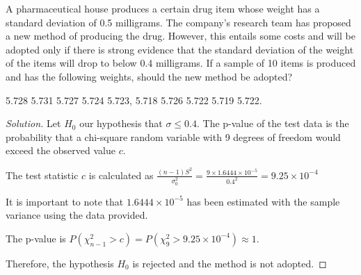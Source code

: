 \documentclass[titlepage, letterpaper, fleqn]{article}
\renewcommand\qedsymbol{\(\blacksquare\)}
\newenvironment{solution}
{\renewcommand\qedsymbol{$\square$}\begin{proof}[Solution]}
{\end{proof}}
\begin{document}
{\large A pharmaceutical house produces a certain drug item whose weight has a standard deviation of 0.5 milligrams.
The company's research team has proposed a new method of producing the drug.
However, this entails some costs and will be adopted only if there is strong evidence that the standard deviation of the weight of the items will drop to below 0.4 milligrams.
If a sample of 10 items is produced and has the following weights, should the new method be adopted?

5.728  5.731  5.727  5.724  5.723,
5.718  5.726  5.722  5.719  5.722.}

\begin{solution}
Let $H_0$ our hypothesis that $\sigma \leq 0.4$.
The p-value of the test data is the probability that a chi-square random variable with 9 degrees of freedom would exceed the observed value $c$.

The test statistic $c$ is calculated as $\frac{(n-1)S^2}{\sigma^2_0} = \frac{9 \times 1.6444 \times 10^{-5}}{0.4^2} = 9.25 \times 10^{-4}$

It is important to note that $1.6444\times 10^{-5}$ has been estimated with the sample variance using the data provided.

The p-value is $P(\chi^2_{n-1} > c) = P(\chi^2_{9} > 9.25\times10^{-4}) \approx 1$.

Therefore, the hypothesis $H_0$ is rejected and the method is not adopted.
\end{solution}
\end{document}
